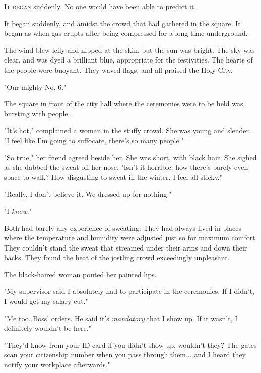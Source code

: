 \lettrine{I}{t began} suddenly. No one would have been able to predict it.

It began suddenly, and amidst the crowd that had gathered in the square.
It began as when gas erupts after being compressed for a long time
underground.


The wind blew icily and nipped at the skin, but the sun was bright. The
sky was clear, and was dyed a brilliant blue, appropriate for the
festivities. The hearts of the people were buoyant. They waved flags,
and all praised the Holy City.

"Our mighty No. 6."

The square in front of the city hall where the ceremonies were to be
held was bursting with people.

"It's hot," complained a woman in the stuffy crowd. She was young and
slender. "I feel like I'm going to suffocate, there's so many people."

"So true," her friend agreed beside her. She was short, with black hair.
She sighed as she dabbed the sweat off her nose. "Isn't it horrible, how
there's barely even space to walk? How disgusting to sweat in the
winter. I feel all sticky."

"Really, I don't believe it. We dressed up for nothing."

"I \emph{know}."

Both had barely any experience of sweating. They had always lived in
places where the temperature and humidity were adjusted just so for
maximum comfort. They couldn't stand the sweat that streamed under their
arms and down their backs. They found the heat of the jostling crowd
exceedingly unpleasant.

The black-haired woman pouted her painted lips.

"My supervisor said I absolutely had to participate in the ceremonies.
If I didn't, I would get my salary cut."

"Me too. Boss' orders. He said it's \emph{mandatory} that I show up. If it
wasn't, I definitely wouldn't be here."

"They'd know from your ID card if you didn't show up, wouldn't they? The
gates scan your citizenship number when you pass through them... and I
heard they notify your workplace afterwards."

